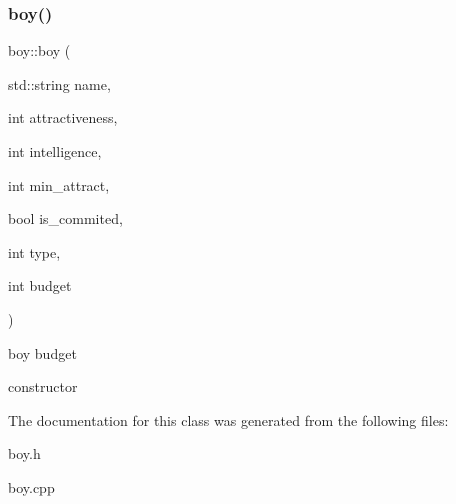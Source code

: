 \subsubsection{\texorpdfstring{boy()}{boy()}}
{\footnotesize\ttfamily boy\+::boy (\begin{DoxyParamCaption}\item[{std\+::string}]{name,  }\item[{int}]{attractiveness,  }\item[{int}]{intelligence,  }\item[{int}]{min\+\_\+attract,  }\item[{bool}]{is\+\_\+commited,  }\item[{int}]{type,  }\item[{int}]{budget }\end{DoxyParamCaption})}



boy budget 

constructor 

The documentation for this class was generated from the following files\+:\begin{DoxyCompactItemize}
\item 
boy.\+h\item 
boy.\+cpp\end{DoxyCompactItemize}
